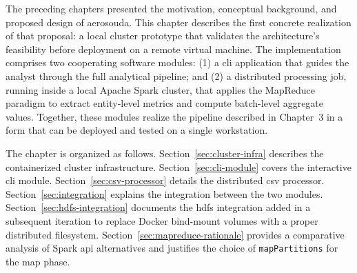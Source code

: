 

The preceding chapters presented the motivation, conceptual background, and proposed design of
\gls{aerosouda}. This chapter describes the first concrete realization of that proposal: a local
cluster prototype that validates the architecture's feasibility before deployment on a remote
virtual machine. The implementation comprises two cooperating software modules: (1) a \gls{cli}
application that guides the analyst through the full analytical pipeline; and (2) a distributed
processing job, running inside a local Apache Spark cluster, that applies the MapReduce paradigm
to extract entity-level metrics and compute batch-level aggregate values. Together, these modules
realize the pipeline described in Chapter~3 in a form that can be deployed and tested on a
single workstation.

The chapter is organized as follows.
Section~\ref{sec:cluster-infra} describes the containerized cluster infrastructure.
Section~\ref{sec:cli-module} covers the interactive \gls{cli} module.
Section~\ref{sec:csv-processor} details the distributed \gls{csv} processor.
Section~\ref{sec:integration} explains the integration between the two modules.
Section~\ref{sec:hdfs-integration} documents the \gls{hdfs} integration added in a subsequent
iteration to replace Docker bind-mount volumes with a proper distributed filesystem.
Section~\ref{sec:mapreduce-rationale} provides a comparative analysis of Spark \gls{api}
alternatives and justifies the choice of \texttt{mapPartitions} for the map phase.

